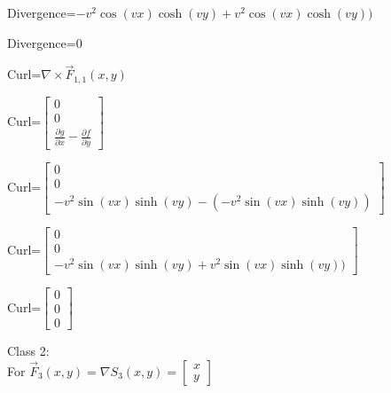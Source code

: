 \documentclass[12pt, executivepaper]{article}
\begin{document}
\begin{flushleft}
\vspace{3mm}

Divergence=$-v^2\cos(vx)\cosh(vy)+v^2\cos(vx)\cosh(vy))$ \\

\vspace{3mm}

Divergence=$0$ \\

\vspace{3mm}

Curl=$\nabla \times \vec F_{1,1}(x,y)$ \\

\vspace{3mm}

Curl=$\begin{bmatrix}
0 \\
0 \\
\frac{\partial g}{\partial x}-\frac{\partial f}{\partial y}
\end{bmatrix}$ \\

\vspace{3mm}

Curl=$\begin{bmatrix}
0 \\
0 \\
-v^2\sin(vx)\sinh(vy)-(-v^2\sin(vx)\sinh(vy))
\end{bmatrix}$ \\

\vspace{3mm}

Curl=$\begin{bmatrix}
0 \\
0 \\
-v^2\sin(vx)\sinh(vy)+v^2\sin(vx)\sinh(vy))
\end{bmatrix}$ \\

\vspace{3mm}

Curl=$\begin{bmatrix}
0 \\
0 \\
0
\end{bmatrix}$ \\

\vspace{5mm}

Class 2: \\
For $\vec F_{3}(x,y)=\nabla S_{3}(x,y)=
\begin{bmatrix}
x \\
y
\end{bmatrix}$


\end{flushleft}
\end{document}
